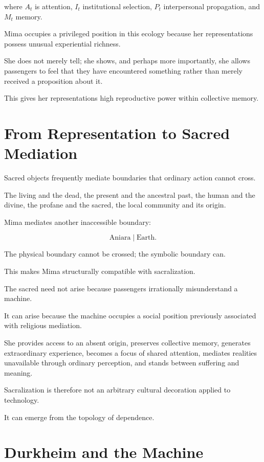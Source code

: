 \documentclass[11pt,oneside]{book}
\theoremstyle{definition}
\theoremstyle{remark}
\begin{document}
where \(A_t\) is attention, \(I_t\) institutional selection, \(P_t\) interpersonal propagation, and \(M_t\) memory.

Mima occupies a privileged position in this ecology because her representations possess unusual experiential richness.

She does not merely tell; she shows, and perhaps more importantly, she allows passengers to feel that they have encountered something rather than merely received a proposition about it.

This gives her representations high reproductive power within collective memory.

\section{From Representation to Sacred Mediation}

Sacred objects frequently mediate boundaries that ordinary action cannot cross.

The living and the dead, the present and the ancestral past, the human and the divine, the profane and the sacred, the local community and its origin.

Mima mediates another inaccessible boundary:

\[
\text{Aniara}
\mid
\text{Earth}.
\]

The physical boundary cannot be crossed; the symbolic boundary can.

This makes Mima structurally compatible with sacralization.

The sacred need not arise because passengers irrationally misunderstand a machine.

It can arise because the machine occupies a social position previously associated with religious mediation.

She provides access to an absent origin, preserves collective memory, generates extraordinary experience, becomes a focus of shared attention, mediates realities unavailable through ordinary perception, and stands between suffering and meaning.

Sacralization is therefore not an arbitrary cultural decoration applied to technology.

It can emerge from the topology of dependence.

\section{Durkheim and the Machine}
\end{document}
